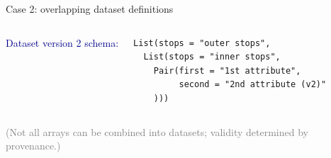 \documentclass[aspectratio=169]{beamer}
\begin{document}
\begin{frame}[fragile]{Case 2: overlapping dataset definitions}
\begin{columns}[t]
\vspace{0.5 cm}
\textcolor{darkblue}{Dataset version 2 schema:}
{\scriptsize
\begin{verbatim}
List(stops = "outer stops",
  List(stops = "inner stops",
    Pair(first = "1st attribute",
         second = "2nd attribute (v2)"
    )))
\end{verbatim}}
\end{columns}

\vspace{-0.5 cm}
\textcolor{gray}{(Not all arrays can be combined into datasets; validity determined by provenance.)}
\end{frame}
\end{document}
